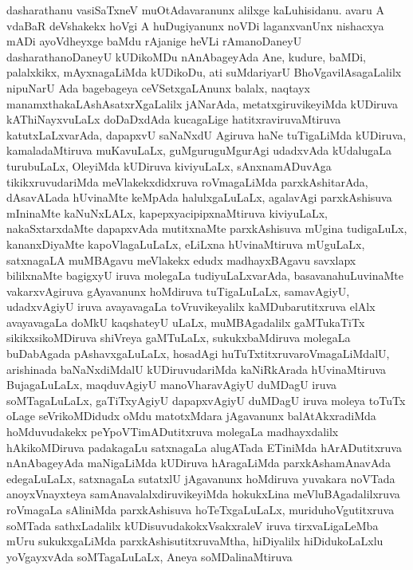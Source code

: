 \documentclass{article}
\begin{document}
\begin{mn}
dasharathanu  vasiSaTxneV  muOtAdavaranunx  alilxge  kaLuhisidanu.  avaru  A  vdaBaR deVshakekx  hoVgi  A  
huDugiyanunx  noVDi  laganxvanUnx  nishacxya  mADi  ayoVdheyxge  baMdu  rAjanige  heVLi  rAmanoDaneyU  
dasharathanoDaneyU  kUDikoMDu  nAnAbageyAda  Ane,  kudure,  baMDi,  palalxkikx,  mAyxnagaLiMda  kUDikoDu,  
ati  suMdariyarU  BhoVgavilAsagaLalilx  nipuNarU  Ada  bagebageya  ceVSetxgaLAnunx  balalx,  naqtayx  
manamxthakaLAshAsatxrXgaLalilx  jANarAda,  metatxgiruvikeyiMda  kUDiruva  kAThiNayxvuLaLx  doDaDxdAda  
kucagaLige  hatitxraviruvaMtiruva  katutxLaLxvarAda,  dapapxvU  saNaNxdU  Agiruva  haNe  tuTigaLiMda  kUDiruva,  
kamaladaMtiruva  muKavuLaLx,  guMguruguMgurAgi  udadxvAda  kUdalugaLa  turubuLaLx,  OleyiMda  kUDiruva  kiviyuLaLx,  
sAnxnamADuvAga  tikikxruvudariMda  meVlakekxdidxruva  roVmagaLiMda  parxkAshitarAda,  dAsavALada  hUvinaMte  keMpAda  
halulxgaLuLaLx,  agalavAgi  parxkAshisuva  mIninaMte  kaNuNxLALx,  kapepxyacipipxnaMtiruva  kiviyuLaLx,  nakaSxtarxdaMte  
dapapxvAda  mutitxnaMte  parxkAshisuva  mUgina  tudigaLuLx,  kananxDiyaMte  kapoVlagaLuLaLx,  eLiLxna  hUvinaMtiruva  
mUguLaLx,  satxnagaLA  muMBAgavu  meVlakekx  edudx  madhayxBAgavu  savxlapx  bililxnaMte  bagigxyU  iruva  molegaLa  
tudiyuLaLxvarAda,  basavanahuLuvinaMte  vakarxvAgiruva  gAyavanunx  hoMdiruva  tuTigaLuLaLx,  samavAgiyU,  udadxvAgiyU  
iruva  avayavagaLa  toVruvikeyalilx  kaMDubarutitxruva  elAlx  avayavagaLa  doMkU  kaqshateyU  uLaLx,  muMBAgadalilx  
gaMTukaTiTx  sikikxsikoMDiruva  shiVreya  gaMTuLaLx,  sukukxbaMdiruva  molegaLa  buDabAgada  pAshavxgaLuLaLx,  hosadAgi  
huTuTxtitxruvaroVmagaLiMdalU,  arishinada  baNaNxdiMdalU  kUDiruvudariMda  kaNiRkArada  hUvinaMtiruva  BujagaLuLaLx,  
maqduvAgiyU  manoVharavAgiyU  duMDagU  iruva  soMTagaLuLaLx,  gaTiTxyAgiyU  dapapxvAgiyU  duMDagU  iruva  moleya  toTuTx  
oLage  seVrikoMDidudx  oMdu  matotxMdara  jAgavanunx  balAtAkxradiMda  hoMduvudakekx  peYpoVTimADutitxruva  molegaLa  
madhayxdalilx  hAkikoMDiruva  padakagaLu  satxnagaLa  alugATada  ETiniMda  hArADutitxruva  nAnAbageyAda  maNigaLiMda  
kUDiruva  hAragaLiMda  parxkAshamAnavAda  edegaLuLaLx,  satxnagaLa  sutatxlU  jAgavanunx  hoMdiruva  yuvakara  noVTada  
anoyxVnayxteya  samAnavalalxdiruvikeyiMda  hokukxLina  meVluBAgadalilxruva  roVmagaLa  sAliniMda  parxkAshisuva  
hoTeTxgaLuLaLx,  muriduhoVgutitxruva  soMTada  sathxLadalilx  kUDisuvudakokxVsakxraleV  iruva  tirxvaLigaLeMba  mUru  
sukukxgaLiMda  parxkAshisutitxruvaMtha,  hiDiyalilx  hiDidukoLaLxlu  yoVgayxvAda  soMTagaLuLaLx,  Aneya  soMDalinaMtiruva  

\end{mn}
\end{document}
